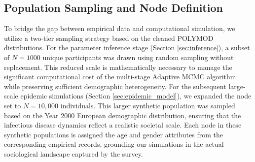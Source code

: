 \subsection{Population Sampling and Node Definition}
\label{subsec:sampling}
To bridge the gap between empirical data and computational simulation, we utilize a two-tier sampling strategy based on the cleaned POLYMOD distributions.
For the parameter inference stage (Section \ref{sec:inference}), a subset of $N = 1000$ unique participants was drawn using random sampling without replacement.
This reduced scale is mathematically necessary to manage the significant computational cost of the multi-stage Adaptive MCMC algorithm while preserving sufficient demographic heterogeneity.
For the subsequent large-scale epidemic simulations (Section \ref{sec:epidemic_model}), we expanded the node set to $N = 10,000$ individuals.
This larger synthetic population was sampled based on the Year 2000 European demographic distribution, ensuring that the infectious disease dynamics reflect a realistic societal scale.
Each node in these synthetic populations is assigned the age and gender attributes from the corresponding empirical records, grounding our simulations in the actual sociological landscape captured by the survey.